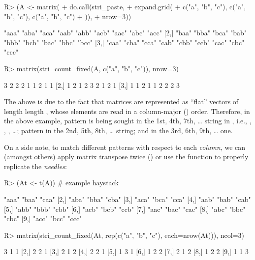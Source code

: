 \documentclass[nojss]{jss}\usepackage[]{graphicx}\usepackage[]{color}
\begin{document}
\begin{itemize}
\begin{Schunk}
\begin{Sinput}
R> (A <- matrix(
+    do.call(stri_paste,
+      expand.grid(
+        c("a", "b", "c"), c("a", "b", "c"), c("a", "b", "c")
+      )),
+    nrow=3))
\end{Sinput}
\begin{Soutput}
     [,1]  [,2]  [,3]  [,4]  [,5]  [,6]  [,7]  [,8]  [,9]
[1,] "aaa" "aba" "aca" "aab" "abb" "acb" "aac" "abc" "acc"
[2,] "baa" "bba" "bca" "bab" "bbb" "bcb" "bac" "bbc" "bcc"
[3,] "caa" "cba" "cca" "cab" "cbb" "ccb" "cac" "cbc" "ccc"
\end{Soutput}
\begin{Sinput}
R> matrix(stri_count_fixed(A, c("a", "b", "c")), nrow=3)
\end{Sinput}
\begin{Soutput}
     [,1] [,2] [,3] [,4] [,5] [,6] [,7] [,8] [,9]
[1,]    3    2    2    2    1    1    2    1    1
[2,]    1    2    1    2    3    2    1    2    1
[3,]    1    1    2    1    1    2    2    2    3
\end{Soutput}
\end{Schunk}

The above is due to the fact that matrices are
represented as ``flat'' vectors of length length ,
whose elements are read in a column-major () order.
Therefore, in the above example,
pattern  is being sought in the 1st, 4th, 7th,
\dots{} string in , i.e., , , , \dots;
pattern  in the 2nd, 5th, 8th, \dots{} string;
and  in the 3rd, 6th, 9th, \dots{} one.

\medskip
On a side note, to match different patterns
with respect to each \textit{column}, we can (amongst others)
apply matrix transpose twice ()
or use
the  function
to properly replicate the \textit{needles}:

\begin{Schunk}
\begin{Sinput}
R> (At <- t(A))  # example haystack
\end{Sinput}
\begin{Soutput}
      [,1]  [,2]  [,3]
 [1,] "aaa" "baa" "caa"
 [2,] "aba" "bba" "cba"
 [3,] "aca" "bca" "cca"
 [4,] "aab" "bab" "cab"
 [5,] "abb" "bbb" "cbb"
 [6,] "acb" "bcb" "ccb"
 [7,] "aac" "bac" "cac"
 [8,] "abc" "bbc" "cbc"
 [9,] "acc" "bcc" "ccc"
\end{Soutput}
\begin{Sinput}
R> matrix(stri_count_fixed(At, rep(c("a", "b", "c"), each=nrow(At))), ncol=3)
\end{Sinput}
\begin{Soutput}
      [,1] [,2] [,3]
 [1,]    3    1    1
 [2,]    2    2    1
 [3,]    2    1    2
 [4,]    2    2    1
 [5,]    1    3    1
 [6,]    1    2    2
 [7,]    2    1    2
 [8,]    1    2    2
 [9,]    1    1    3
\end{Soutput}
\end{Schunk}


\end{itemize}
\end{document}
